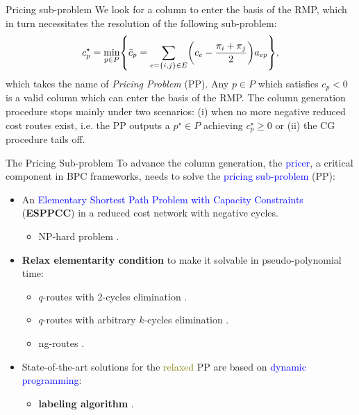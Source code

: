 \begin{frame}{Pricing sub-problem}
	We look for a column to enter the basis of the RMP,
	which in turn necessitates the resolution of the following sub-problem:
	\begin{equation}\label{eq:pp-problem}
		{c^\star_p} = \min_{p \in P} \Set*{ \bar{c}_p = \sum_{e = \Set*{i, j} \in E} \Expr*{c_{e} - \frac{\pi_i + \pi_j}{2}} a_{ep}  },
	\end{equation}
	which takes the name of \textit{Pricing Problem} (PP).
	Any $p \in P$ which satisfies $c_p < 0$ is a valid column which can enter the basis of the RMP.
	The column generation procedure stops mainly under two scenarios:
	(i) when no more negative reduced cost routes exist,
	i.e. the PP outputs a $p^\star \in P$ achieving $c^\star_p \ge 0$
	or
	(ii) the CG procedure tails off.

\end{frame}

\begin{frame}{The Pricing Sub-problem}
	To advance the column generation, the \textcolor{blue}{pricer}, a critical component in BPC frameworks, needs to solve the \textcolor{blue}{pricing sub-problem} (PP):
	\begin{itemize}
		\item An \textcolor{blue}{Elementary Shortest Path Problem with Capacity Constraints} (\textbf{ESPPCC}) in a reduced cost network with negative cycles.
		      \begin{itemize}
			      \item NP-hard problem \parencite{dror1994}.
		      \end{itemize}
		\item \textbf{Relax elementarity condition} to make it solvable in pseudo-polynomial time:
		      \begin{itemize}
			      \item $q$-routes with 2-cycles elimination \parencite{christofides1969}.
			      \item $q$-routes with arbitrary $k$-cycles elimination \parencite{christofides1969}.
			      \item ng-routes \parencite{baldacci2011}.
		      \end{itemize}
		\item State-of-the-art solutions for the \textcolor{olive}{relaxed} PP are based on \textcolor{blue}{dynamic programming}:
		      \begin{itemize}
			      \item \textbf{labeling algorithm} \parencite{desrochers1992, feillet2004}.
		      \end{itemize}
	\end{itemize}
\end{frame}
